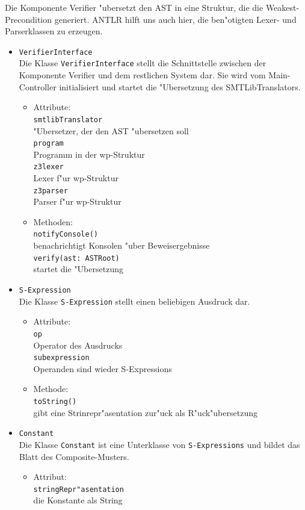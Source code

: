\documentclass[10pt,a4paper,titlepage]{article}
\begin{document}
Die Komponente Verifier "ubersetzt den AST in eine Struktur, die die Weakest-Precondition generiert. ANTLR hilft uns auch hier, die ben"otigten Lexer- und Parserklassen zu erzeugen. 
\begin{itemize}
\item \texttt{VerifierInterface} \\
Die Klasse \texttt{VerifierInterface} stellt die Schnittstelle zwischen der Komponente Verifier und dem restlichen System dar. Sie wird vom Main-Controller initialisiert und startet die "Ubersetzung des SMTLibTranslators. 
\begin{itemize}
\item Attribute: \\
\texttt{smtlibTranslator} \\
"Ubersetzer, der den AST "ubersetzen soll \\
\texttt{program} \\
Programm in der wp-Struktur \\
\texttt{z3lexer} \\
Lexer f"ur wp-Struktur \\
\texttt{z3parser} \\
Parser f"ur wp-Struktur 
\item Methoden: \\
\texttt{notifyConsole()} \\
benachrichtigt Konsolen "uber Beweisergebnisse \\
\texttt{verify(ast: ASTRoot)} \\
startet die "Ubersetzung
\end{itemize}
\item \texttt{S-Expression} \\
Die Klasse \texttt{S-Expression} stellt einen beliebigen Ausdruck dar. 
\begin{itemize}
\item Attribute: \\
\texttt{op} \\
Operator des Ausdrucks \\
\texttt{subexpression} \\
Operanden sind wieder S-Expressions 
\item Methode: \\
\texttt{toString()} \\
gibt eine Strinrepr"asentation zur"uck als R"uck"ubersetzung 
\end{itemize}
\item \texttt{Constant} \\
Die Klasse \texttt{Constant} ist eine Unterklasse von \texttt{S-Expressions} und bildet das Blatt des Composite-Musters. 
\begin{itemize}
\item Attribut: \\
\texttt{stringRepr"asentation} \\
die Konstante als String \\
\end{itemize}
\end{itemize}
\end{document}
